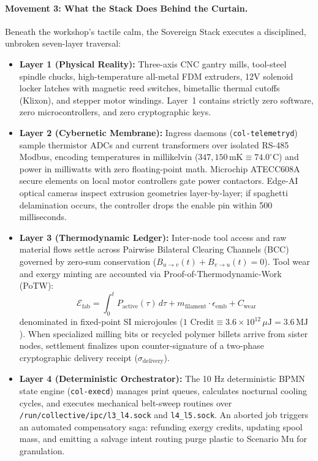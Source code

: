 \paragraph{Movement 3: What the Stack Does Behind the Curtain.}
Beneath the workshop's tactile calm, the Sovereign Stack executes a disciplined, unbroken seven-layer traversal:
\begin{itemize}
    \item \textbf{Layer 1 (Physical Reality):} Three-axis CNC gantry mills, tool-steel spindle chucks, high-temperature all-metal FDM extruders, 12V solenoid locker latches with magnetic reed switches, bimetallic thermal cutoffs (Klixon), and stepper motor windings. Layer~1 contains strictly zero software, zero microcontrollers, and zero cryptographic keys.
    \item \textbf{Layer 2 (Cybernetic Membrane):} Ingress daemons (\texttt{col-telemetryd}) sample thermistor ADCs and current transformers over isolated RS-485 Modbus, encoding temperatures in millikelvin ($347{,}150\,\mathrm{mK} \equiv 74.0^\circ\mathrm{C}$) and power in milliwatts with zero floating-point math. Microchip ATECC608A secure elements on local motor controllers gate power contactors. Edge-AI optical cameras inspect extrusion geometries layer-by-layer; if spaghetti delamination occurs, the controller drops the enable pin within 500 milliseconds.
    \item \textbf{Layer 3 (Thermodynamic Ledger):} Inter-node tool access and raw material flows settle across Pairwise Bilateral Clearing Channels (BCC) governed by zero-sum conservation ($B_{u \to v}(t) + B_{v \to u}(t) = 0$). Tool wear and exergy minting are accounted via Proof-of-Thermodynamic-Work (PoTW):
    \[
    \mathcal{E}_{\mathrm{fab}} = \int_{0}^{t} P_{\mathrm{active}}(\tau) \, d\tau + m_{\mathrm{filament}} \cdot \epsilon_{\mathrm{emb}} + C_{\mathrm{wear}}
    \]
    denominated in fixed-point SI microjoules ($1\text{ Credit} \equiv 3.6 \times 10^{12}\,\mu\mathrm{J} = 3.6\,\mathrm{MJ}$). When specialized milling bits or recycled polymer billets arrive from sister nodes, settlement finalizes upon counter-signature of a two-phase cryptographic delivery receipt ($\sigma_{\mathrm{delivery}}$).
    \item \textbf{Layer 4 (Deterministic Orchestrator):} The 10 Hz deterministic BPMN state engine (\texttt{col-execd}) manages print queues, calculates nocturnal cooling cycles, and executes mechanical belt-sweep routines over \texttt{/run/collective/ipc/l3\_l4.sock} and \texttt{l4\_l5.sock}. An aborted job triggers an automated compensatory saga: refunding exergy credits, updating spool mass, and emitting a salvage intent routing purge plastic to Scenario Mu for granulation.

\end{itemize}
